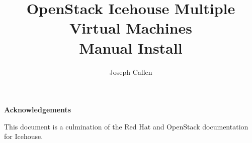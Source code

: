 \documentclass[11pt,letterpaper,oneside]{book}
\title{OpenStack Icehouse Multiple Virtual Machines \\ 
Manual Install}
\author{Joseph Callen}
\begin{document}
\frontmatter


\maketitle
\newenvironment{acknowledgements}%
    {\cleardoublepage\thispagestyle{empty}\null\vfill\begin{center}%
    \bfseries Acknowledgements\end{center}}%
    {\vfill\null}
        \begin{acknowledgements}
        This document is a culmination of the Red Hat and OpenStack documentation for Icehouse. 
        \end{acknowledgements}
\tableofcontents
\listoffigures
\listoftables
\lstlistoflistings



\mainmatter
\end{document}
